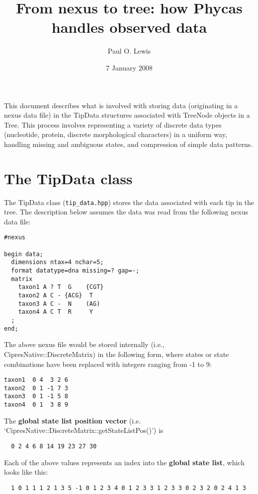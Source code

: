 \documentclass[12pt]{article}
\newcommand{\hppfile}[1]{{\tt #1}}
\newcommand{\newterm}[1]{{\bfseries #1}}
\begin{document}
\title{From nexus to tree: how Phycas handles observed data}
\author{Paul O. Lewis}
\date{7 January 2008}
\maketitle

This document describes what is involved with storing data (originating in a nexus data file) in the TipData structures associated with TreeNode objects in a Tree. This process involves representing a variety of discrete data types (nucleotide, protein, discrete morphological characters) in a uniform way, handling missing and ambiguous states, and compression of simple data patterns.

\section{The TipData class}

The TipData class (\hppfile{tip\_data.hpp}) stores the data associated with each tip in the tree. The description below assumes the data was
read from the following nexus data file:
\begin{verbatim}
#nexus

begin data;
  dimensions ntax=4 nchar=5;
  format datatype=dna missing=? gap=-;
  matrix
    taxon1 A ? T  G    {CGT}
    taxon2 A C - {ACG}  T 
    taxon3 A C -  N    (AG)
    taxon4 A C T  R     Y
  ;
end;
\end{verbatim}

The above nexus file would be stored internally (i.e., CipresNative::DiscreteMatrix) in the following form, where 
states or state combinations have been replaced with integers ranging from -1 to 9:

\begin{verbatim}
taxon1  0 4  3 2 6
taxon2  0 1 -1 7 3
taxon3  0 1 -1 5 8
taxon4  0 1  3 8 9
\end{verbatim}

The \newterm{global state list position vector} (i.e. `CipresNative::DiscreteMatrix::getStateListPos()') is 
\begin{verbatim}
  0 2 4 6 8 14 19 23 27 30
\end{verbatim}

Each of the above values represents an index into the \newterm{global state list}, which looks like this:
\begin{verbatim}
  1 0 1 1 1 2 1 3 5 -1 0 1 2 3 4 0 1 2 3 3 1 2 3 3 0 2 3 2 0 2 4 1 3
\end{verbatim}
\end{document}
